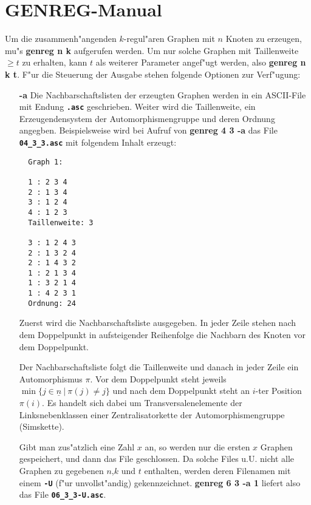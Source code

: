

\parindent0mm

\section*{GENREG-Manual}  

\medskip
Um die zusammenh"angenden $k$-regul"aren Graphen mit $n$ Knoten zu erzeugen,
mu"s {\bf genreg n k} aufgerufen werden. Um nur solche Graphen
mit Taillenweite $\geq t$ zu erhalten, kann $t$ als weiterer
Parameter angef"ugt werden, also {\bf genreg n k t}. F"ur
die Steuerung der Ausgabe stehen folgende Optionen zur Verf"ugung:

\begin{itemize}

 \item[\bf -a]
  Die Nachbarschaftslisten der erzeugten Graphen werden in ein
  ASCII-File mit Endung {\bf \verb|.asc|} geschrieben. Weiter wird
  die Taillenweite, ein Erzeugendensystem der Automorphismengruppe
  und deren Ordnung angegben. Beispielsweise wird bei Aufruf von
  {\bf genreg 4 3 -a} das File {\bf \verb|04_3_3.asc|}
  mit folgendem Inhalt erzeugt:
  \begin{verbatim}
  Graph 1:

  1 : 2 3 4
  2 : 1 3 4
  3 : 1 2 4
  4 : 1 2 3
  Taillenweite: 3

  3 : 1 2 4 3
  2 : 1 3 2 4
  2 : 1 4 3 2
  1 : 2 1 3 4
  1 : 3 2 1 4
  1 : 4 2 3 1
  Ordnung: 24
  \end{verbatim}Zuerst wird die Nachbarschaftsliste ausgegeben. In jeder Zeile
  stehen nach dem Doppelpunkt in aufsteigender Reihenfolge die
  Nachbarn des Knoten vor dem Doppelpunkt.

  Der Nachbarschaftsliste
  folgt die Taillenweite und danach in jeder Zeile ein Automorphismus
  $\pi$.
  Vor dem Doppelpunkt steht jeweils
  $\min \{ j \in \underline{n}\ |\ \pi (j) \not= j \} $
  und nach dem Doppelpunkt steht an $i$-ter Position $\pi (i)$.
  Es handelt sich dabei um Transversalenelemente der Linksnebenklassen einer
  Zentralisatorkette der Automorphismengruppe (Simskette).

  Gibt man zus"atzlich eine Zahl $x$ an,
  so werden nur die ersten $x$ Graphen gespeichert,
  und dann das File geschlossen. Da solche Files u.U. nicht alle
  Graphen zu gegebenen $n$,$k$ und $t$ enthalten,
  werden deren Filenamen mit einem
  {\bf \verb|-U|} (f"ur \glqq unvollst"andig\grqq ) gekennzeichnet.
  {\bf genreg 6 3 -a 1} liefert also
  das File {\bf \verb|06_3_3-U.asc|}.


\end{itemize}
